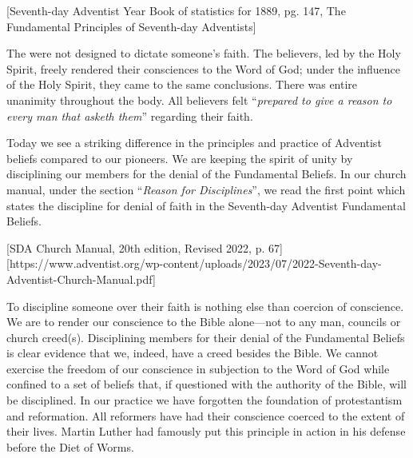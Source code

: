 [Seventh-day Adventist Year Book of statistics for 1889, pg. 147, The Fundamental Principles of Seventh-day Adventists]

The  were not designed to dictate someone’s faith. The believers, led by the Holy Spirit, freely rendered their consciences to the Word of God; under the influence of the Holy Spirit, they came to the same conclusions. There was entire unanimity throughout the body. All believers felt “\textit{prepared to give a reason to every man that asketh them}” regarding their faith.

Today we see a striking difference in the principles and practice of Adventist beliefs compared to our pioneers. We are keeping the spirit of unity by disciplining our members for the denial of the Fundamental Beliefs. In our church manual, under the section “\textit{Reason for Disciplines}”, we read the first point which states the discipline for denial of faith in the Seventh-day Adventist Fundamental Beliefs.


[SDA Church Manual, 20th edition, Revised 2022, p. 67][https://www.adventist.org/wp-content/uploads/2023/07/2022-Seventh-day-Adventist-Church-Manual.pdf]

To discipline someone over their faith is nothing else than coercion of conscience. We are to render our conscience to the Bible alone—not to any man, councils or church creed(s). Disciplining members for their denial of the Fundamental Beliefs is clear evidence that we, indeed, have a creed besides the Bible. We cannot exercise the freedom of our conscience in subjection to the Word of God while confined to a set of beliefs that, if questioned with the authority of the Bible, will be disciplined. In our practice we have forgotten the foundation of protestantism and reformation. All reformers have had their conscience coerced to the extent of their lives. Martin Luther had famously put this principle in action in his defense before the Diet of Worms.

